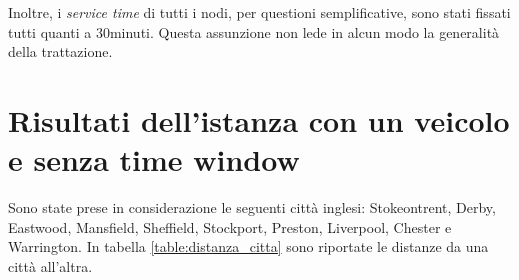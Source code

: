 		Inoltre, i \emph{service time} di tutti i nodi, per questioni semplificative, sono stati fissati tutti quanti a 30minuti. Questa assunzione non lede in alcun modo la generalità della trattazione.

	\section{Risultati dell’istanza con un veicolo e senza time window}
	\label{sec:istanza_singolo_veicolo_no_time_window}
		Sono state prese in considerazione le seguenti città inglesi: Stokeontrent,	Derby, Eastwood, Mansfield,	Sheffield, Stockport, Preston, Liverpool, Chester e Warrington. In tabella \ref{table:distanza_citta} sono riportate le distanze da una città all’altra.

		\vspace{0.5cm}

